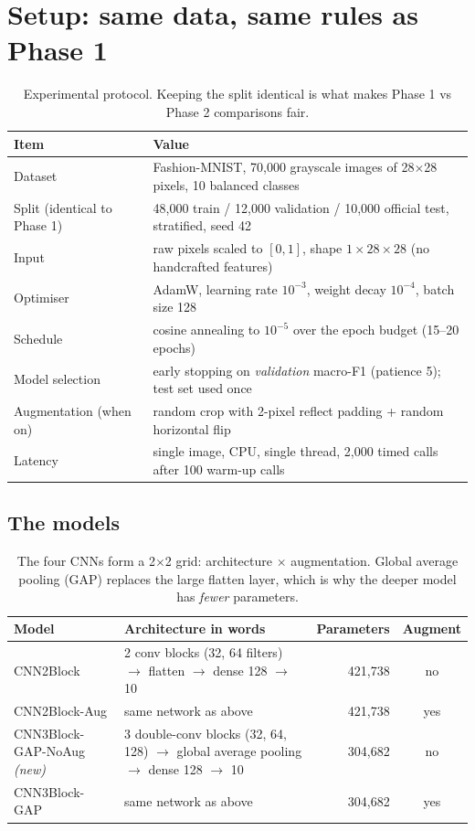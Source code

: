 \documentclass[11pt,a4paper]{article}
\begin{document}
\section{Setup: same data, same rules as Phase 1}

\begin{table}[H]\centering\small
\begin{tabularx}{\linewidth}{lX}
\toprule
\textbf{Item} & \textbf{Value} \\ \midrule
Dataset & Fashion-MNIST, 70,000 grayscale images of 28$\times$28 pixels, 10 balanced classes \\
Split (identical to Phase 1) & 48,000 train / 12,000 validation / 10,000 official test, stratified, seed 42 \\
Input & raw pixels scaled to $[0,1]$, shape $1\times28\times28$ (no handcrafted features) \\
Optimiser & AdamW, learning rate $10^{-3}$, weight decay $10^{-4}$, batch size 128 \\
Schedule & cosine annealing to $10^{-5}$ over the epoch budget (15--20 epochs) \\
Model selection & early stopping on \emph{validation} macro-F1 (patience 5); test set used once \\
Augmentation (when on) & random crop with 2-pixel reflect padding + random horizontal flip \\
Latency & single image, CPU, single thread, 2,000 timed calls after 100 warm-up calls \\
\bottomrule
\end{tabularx}
\caption{Experimental protocol. Keeping the split identical is what makes Phase 1 vs Phase 2 comparisons fair.}
\end{table}

\subsection{The models}
\begin{table}[H]\centering\small
\begin{tabularx}{\linewidth}{l X r c}
\toprule
\textbf{Model} & \textbf{Architecture in words} & \textbf{Parameters} & \textbf{Augment} \\ \midrule
CNN2Block & 2 conv blocks (32, 64 filters) $\rightarrow$ flatten $\rightarrow$ dense 128 $\rightarrow$ 10 & 421,738 & no \\
CNN2Block-Aug & same network as above & 421,738 & yes \\
CNN3Block-GAP-NoAug \emph{(new)} & 3 double-conv blocks (32, 64, 128) $\rightarrow$ global average pooling $\rightarrow$ dense 128 $\rightarrow$ 10 & 304,682 & no \\
\rowcolor{soft}CNN3Block-GAP & same network as above & 304,682 & yes \\
\bottomrule
\end{tabularx}
\caption{The four CNNs form a 2$\times$2 grid: architecture $\times$ augmentation. Global average pooling (GAP)
replaces the large flatten layer, which is why the deeper model has \emph{fewer} parameters.}
\end{table}
\end{document}
